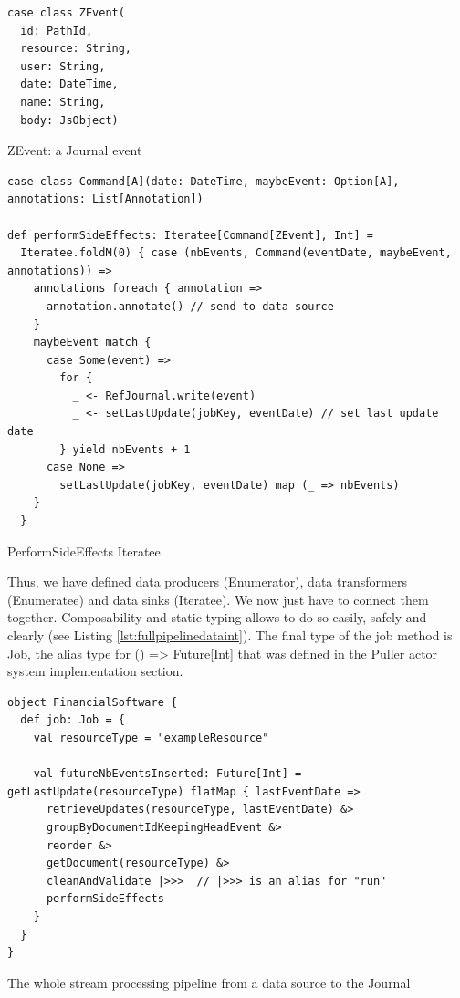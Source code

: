 \begin{listing}[h]
\begin{verbatim}
case class ZEvent(
  id: PathId,
  resource: String,
  user: String,
  date: DateTime,
  name: String,
  body: JsObject)
\end{verbatim}
\caption{ZEvent: a Journal event}
\label{lst:zevent}
\end{listing}

\begin{listing}[h]
\begin{verbatim}
case class Command[A](date: DateTime, maybeEvent: Option[A], annotations: List[Annotation]) 

def performSideEffects: Iteratee[Command[ZEvent], Int] =
  Iteratee.foldM(0) { case (nbEvents, Command(eventDate, maybeEvent, annotations)) =>
    annotations foreach { annotation =>
      annotation.annotate() // send to data source
    }
    maybeEvent match {
      case Some(event) =>
        for {
          _ <- RefJournal.write(event)
          _ <- setLastUpdate(jobKey, eventDate) // set last update date
        } yield nbEvents + 1
      case None =>
        setLastUpdate(jobKey, eventDate) map (_ => nbEvents)
    }
  }
\end{verbatim}
\caption{PerformSideEffects Iteratee}
\label{lst:finaliterateedataint}
\end{listing}

Thus, we have defined data producers (Enumerator), data transformers (Enumeratee) and data sinks (Iteratee). We now just have to connect them together. Composability
and static typing allows to do so easily, safely and clearly (see Listing \ref{lst:fullpipelinedataint}). The final type of the job method is Job, the alias type for
() => Future[Int] that was defined in the Puller actor system implementation section.

\begin{listing}[h]
\begin{verbatim}
object FinancialSoftware {
  def job: Job = {
    val resourceType = "exampleResource"
    
    val futureNbEventsInserted: Future[Int] = getLastUpdate(resourceType) flatMap { lastEventDate =>
      retrieveUpdates(resourceType, lastEventDate) &>
      groupByDocumentIdKeepingHeadEvent &>
      reorder &>
      getDocument(resourceType) &>
      cleanAndValidate |>>>  // |>>> is an alias for "run"
      performSideEffects
    }
  }
}

\end{verbatim}
\caption{The whole stream processing pipeline from a data source to the Journal}
\label{lst:fullpipelinedataint}
\end{listing}


